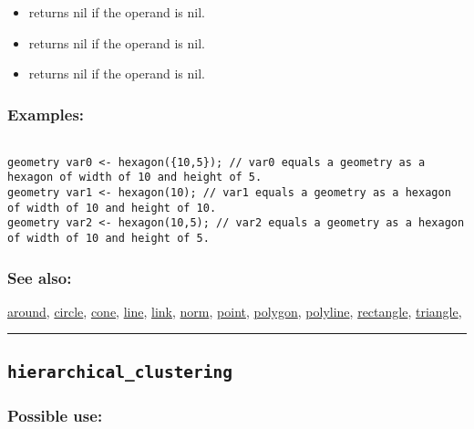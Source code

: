 \documentclass[]{book}
\providecommand{\tightlist}{%
  \setlength{\itemsep}{0pt}\setlength{\parskip}{0pt}}
\theoremstyle{definition}
\theoremstyle{definition}
\theoremstyle{definition}
\theoremstyle{remark}
\begin{document}
\begin{itemize}
\tightlist
\item
  returns nil if the operand is nil.\\
\item
  returns nil if the operand is nil.\\
\item
  returns nil if the operand is nil.
\end{itemize}

\subsubsection{Examples:}\label{examples-198}

\begin{verbatim}
 
geometry var0 <- hexagon({10,5}); // var0 equals a geometry as a hexagon of width of 10 and height of 5. 
geometry var1 <- hexagon(10); // var1 equals a geometry as a hexagon of width of 10 and height of 10. 
geometry var2 <- hexagon(10,5); // var2 equals a geometry as a hexagon of width of 10 and height of 5.
\end{verbatim}

\subsubsection{See also:}\label{see-also-111}

\href{OperatorsAA\#around}{around}, \href{OperatorsBC\#circle}{circle},
\href{OperatorsBC\#cone}{cone}, \href{OperatorsIM\#line}{line},
\href{OperatorsIM\#link}{link}, \href{OperatorsNR\#norm}{norm},
\href{OperatorsNR\#point}{point}, \href{OperatorsNR\#polygon}{polygon},
\href{OperatorsNR\#polyline}{polyline},
\href{OperatorsNR\#rectangle}{rectangle},
\href{OperatorsSZ\#triangle}{triangle},

\begin{center}\rule{0.5\linewidth}{\linethickness}\end{center}

\subsection{\texorpdfstring{\texttt{hierarchical\_clustering}}{hierarchical\_clustering}}\label{hierarchical_clustering}

\subsubsection{Possible use:}\label{possible-use-259}
\end{document}
